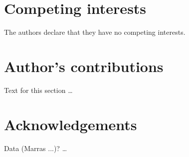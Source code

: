 \documentclass{bmcart}
\begin{document}
\begin{backmatter}

\section*{Competing interests}
  The authors declare that they have no competing interests.

\section*{Author's contributions}
    Text for this section \ldots

\section*{Acknowledgements}
  Data (Marras ...)? \ldots





\end{backmatter}
\end{document}
